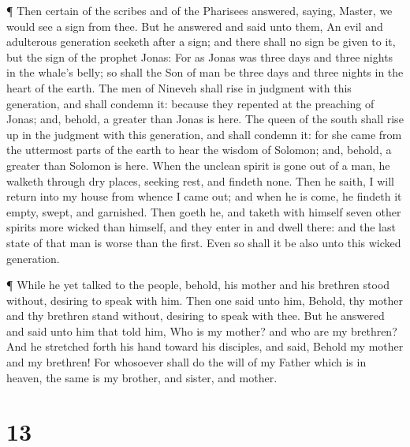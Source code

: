  ¶ Then certain of the scribes and of the Pharisees
answered, saying, Master, we would see a sign from thee. 
But he answered and said unto them, An evil and adulterous generation
seeketh after a sign; and there shall no sign be given to it, but the
sign of the prophet Jonas:  For as Jonas was three days and
three nights in the whale's belly; so shall the Son of man be three days
and three nights in the heart of the earth.  The men of
Nineveh shall rise in judgment with this generation, and shall condemn
it: because they repented at the preaching of Jonas; and, behold, a
greater than Jonas is here.  The queen of the south shall
rise up in the judgment with this generation, and shall condemn it: for
she came from the uttermost parts of the earth to hear the wisdom of
Solomon; and, behold, a greater than Solomon is here.  When
the unclean spirit is gone out of a man, he walketh through dry places,
seeking rest, and findeth none.  Then he saith, I will
return into my house from whence I came out; and when he is come, he
findeth it empty, swept, and garnished.  Then goeth he, and
taketh with himself seven other spirits more wicked than himself, and
they enter in and dwell there: and the last state of that man is worse
than the first. Even so shall it be also unto this wicked generation.

 ¶ While he yet talked to the people, behold, his mother
and his brethren stood without, desiring to speak with him.
 Then one said unto him, Behold, thy mother and thy
brethren stand without, desiring to speak with thee.  But
he answered and said unto him that told him, Who is my mother? and who
are my brethren?  And he stretched forth his hand toward
his disciples, and said, Behold my mother and my brethren! 
For whosoever shall do the will of my Father which is in heaven, the
same is my brother, and sister, and mother.

\hypertarget{section-12}{%
\section{13}\label{section-12}}

